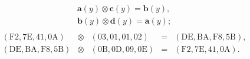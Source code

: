 \[\begin{array}{l}
        \mathbf{a}(y) \otimes \mathbf{c}(y) = \mathbf{b}(y), \\
        \mathbf{b}(y) \otimes \mathbf{d}(y) = \mathbf{a}(y); \\
    \end{array}
\] \[
    \begin{array}{ccccc}
        (\mathrm{F2}, \mathrm{7E}, \mathrm{41}, \mathrm{0A}) & \otimes & (\mathrm{03}, \mathrm{01}, \mathrm{01}, \mathrm{02}) & = & (\mathrm{DE}, \mathrm{BA}, \mathrm{F8}, \mathrm{5B}), \\
        (\mathrm{DE}, \mathrm{BA}, \mathrm{F8}, \mathrm{5B}) & \otimes & (\mathrm{0B}, \mathrm{0D}, \mathrm{09}, \mathrm{0E}) & = & (\mathrm{F2}, \mathrm{7E}, \mathrm{41}, \mathrm{0A}). \\
    \end{array}
\]
\exampleend

